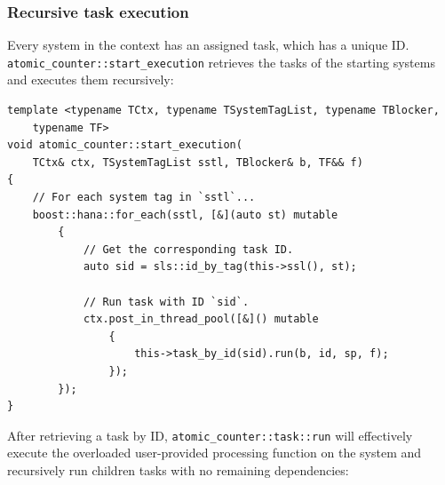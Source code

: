 \documentclass[oneside, 12pt, a4paper, openany]{book}
\begin{document}
\hypertarget{multithreading_recursive_task_execution}{\subsubsection{Recursive
task execution}\label{multithreading_recursive_task_execution}}

Every system in the context has an assigned task, which has a unique ID.
\texttt{atomic_counter::start_execution}
retrieves the tasks of the starting systems and executes them
recursively:

\begin{verbatim}
template <typename TCtx, typename TSystemTagList, typename TBlocker,
    typename TF>
void atomic_counter::start_execution(
    TCtx& ctx, TSystemTagList sstl, TBlocker& b, TF&& f)
{
    // For each system tag in `sstl`...
    boost::hana::for_each(sstl, [&](auto st) mutable
        {
            // Get the corresponding task ID.
            auto sid = sls::id_by_tag(this->ssl(), st);

            // Run task with ID `sid`.
            ctx.post_in_thread_pool([&]() mutable
                {
                    this->task_by_id(sid).run(b, id, sp, f);
                });
        });
}
\end{verbatim}

After retrieving a task by ID,
\texttt{atomic_counter::task::run}
will effectively execute the overloaded user-provided processing
function on the system and recursively run children tasks with no
remaining dependencies:
\end{document}
